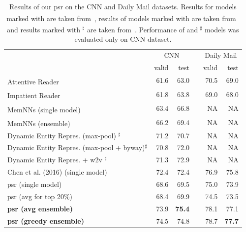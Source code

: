 \documentclass[11pt]{article}
\newcommand{\dg}{\textsuperscript{\dag}}
\newcommand{\ddg}{\textsuperscript{\ddag}}
\newcommand{\dddg}{$^\sharp$}
\begin{document}
\begin{table}[ht!]
\centering
  \begin{tabular}{@{}l@{}rr@{}l@{}rr@{}}
    \toprule
    & \multicolumn{2}{c}{CNN} &\phantom{aa}& \multicolumn{2}{c}{Daily Mail} \\
    \cmidrule{2-3} \cmidrule{5-6}
    & valid & test && valid & test \\
    \midrule
    Attentive Reader \dg             & 61.6 & 63.0 && 70.5 & 69.0 \\
    Impatient Reader \dg               & 61.8 & 63.8 && 69.0 & 68.0 \\
    \midrule
    MemNNs (single model) \ddg & 63.4 & 66.8 && NA & NA \\
    MemNNs (ensemble) \ddg    & 66.2 & 69.4 && NA & NA \\ 
    \midrule
    Dynamic Entity Repres. (max-pool) \dddg    & 71.2 & 70.7 && NA & NA \\ 
    Dynamic Entity Repres. (max-pool + byway)\dddg    & 70.8 & 72.0 && NA & NA \\ 
    Dynamic Entity Repres. + w2v \dddg    & 71.3 & 72.9 && NA & NA \\ 
    \midrule
    Chen et al. (2016) (single model)       & 72.4 & 72.4 && 76.9 & 75.8 \\ 
    \midrule

    \gls{psr} (single model)           & 68.6 & 69.5 && 75.0 & 73.9 \\ %
    \gls{psr} (avg for top 20\%)       & 68.4 & 69.9 && 74.5 & 73.5 \\
    \bf{\gls{psr} (avg ensemble)}   & 73.9 & \bf 75.4 && 78.1 & 77.1 \\ %
    \bf{\gls{psr} (greedy ensemble)}   & 74.5 &  74.8 && 78.7 & \bf 77.7 \\
    \bottomrule
  \end{tabular}
\caption{Results of our \gls{psr} on the CNN and Daily Mail datasets. Results for models marked with \dg{} are taken from~\protect\cite{hermann2015teaching}, results of models marked with \ddg{} are taken
from~\protect\cite{hill2015goldilocks} and results marked with \dddg{} are taken
from~\protect\cite{Kobayashi2016}. Performance of \ddg{} and \dddg{} models was evaluated only on CNN dataset.}
 \label{tab:results-cnn+dm}


\end{table}
\end{document}
